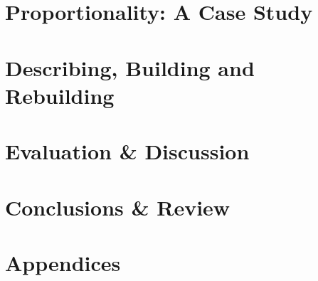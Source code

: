 \documentclass[10pt,oneside,a4paper,onecolumn,titlepage,draft]{lancsthesis}
\begin{document}
\chapter{Proportionality: A Case Study}
\label{sec:personal}


\chapter{Describing, Building and Rebuilding}
\label{sec:rebuilding}


\chapter{Evaluation \& Discussion}
\label{sec:evaluation}


\chapter{Conclusions \& Review}
\label{sec:conclusions}



\backmatter%
\pagebreak%
%



\pagebreak
\appendix
\renewcommand{\thesection}{\Alph{section}}


\chapter{Appendices}





\end{document}

